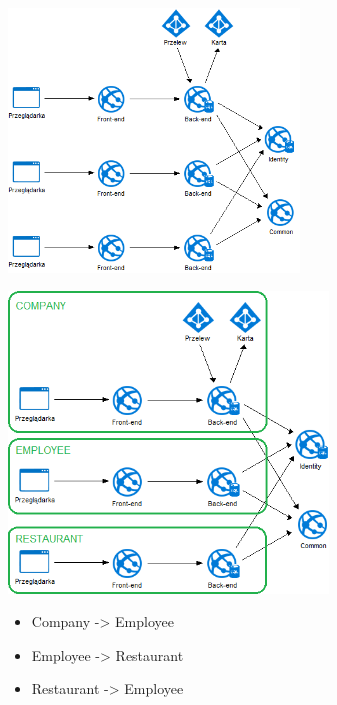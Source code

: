 \documentclass{beamer}
\begin{document}
\begin{frame}{}
	\begin{center}
		\includegraphics[height=7cm]{architektura2.png}
	\end{center}
\end{frame}

\begin{frame}{}
	\begin{center}
		\includegraphics[height=8cm]{architektura4.png}
	\end{center}
\end{frame}

\begin{frame}{}
	\begin{huge}
		\begin{itemize}[<+->]
			\item Company -> Employee
			\item Employee -> Restaurant
			\item Restaurant -> Employee
		\end{itemize}
	\end{huge}
\end{frame}
\end{document}
